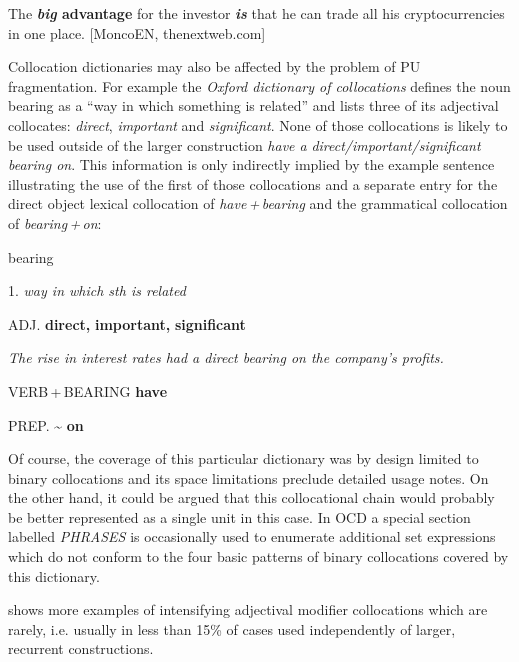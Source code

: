 \documentclass[output=paper]{langscibook}
\begin{document}
\ea\label{ex:pezik:3}
The \textbf{\textit{big} \textbf{advantage}} for the investor \textbf{\textit{is}} that he can trade all his cryptocurrencies in one place. [MoncoEN, thenextweb.com]
\z

Collocation dictionaries may also be affected by the problem of PU fragmentation. For example the \textit{Oxford dictionary of collocations} \citep{CrowtherEtAl2003} defines the noun bearing as a ``way in which something is related'' and lists three of its adjectival collocates: \textit{direct}, \textit{important} and \textit{significant}. None of those collocations is likely to be used outside of the larger construction \textit{have a} \textit{direct\slash important\slash significant} \textit{bearing on}. This information is only indirectly implied by the example sentence illustrating the use of the first of those collocations and a separate entry for the direct object lexical collocation of \textit{have\,+\,bearing} and the grammatical collocation of \textit{bearing\,+\,on}:

\ea
bearing

1. \textit{way in which sth is related}

ADJ. \textbf{direct,} \textbf{important,} \textbf{significant} 

\textit{The rise in interest rates had a direct bearing on the company's profits.}

VERB\,+\,BEARING  \textbf{have}

PREP. {\textasciitilde} \textbf{on}
\z

Of course, the coverage of this particular dictionary was by design limited to binary collocations and its space limitations preclude detailed usage notes. On the other hand, it could be argued that this collocational chain would probably be better represented as a single unit in this case. In OCD a special section labelled \textit{PHRASES} is occasionally used to enumerate additional set expressions which do not conform to the four basic patterns of binary collocations covered by this dictionary.

 shows more examples of intensifying adjectival modifier collocations which are rarely, i.e. usually in less than 15\% of cases used independently of larger, recurrent constructions. 
\end{document}
